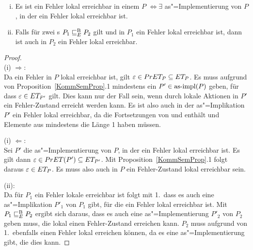 \begin{Kor}\mbox{}
  \label{lokalFehlerErrKor}
  \begin{enumerate}[(i)]
    \item Es ist ein Fehler lokal erreichbar in einem \MEIO{} $P$
      $\Leftrightarrow \exists$ as"=Implementierung von $P$, in der ein Fehler
      lokal erreichbar ist.
    \item Falls für zwei \MEIO{}s $P_1 \sqsubseteq  _E^\mathrm{B} P_2$ gilt und in $P_1$ ein Fehler
      lokal erreichbar ist, dann ist auch in $P_2$ ein Fehler lokal erreichbar.
  \end{enumerate}
\end{Kor}
\begin{proof}\mbox{}\\
  (i) $\Rightarrow$:\\
  Da ein Fehler in $P$ lokal erreichbar ist, gilt $\varepsilon \in PrET _P
  \subseteq ET _P$. Es muss aufgrund von Proposition~\ref{KommSemProp}.1
  mindestens ein $P'\in\mathrm{as}\text{-}\mathrm{impl} (P)$ geben, für dass $\varepsilon \in ET _{P'}$
  gilt. Dies kann nur der Fall sein, wenn durch lokale Aktionen in $P'$
  ein Fehler-Zustand erreicht werden kann. Es ist also auch in der
  as"=Implikation $P'$ ein Fehler lokal erreichbar, da \ET{} die Fortsetzungen
  von \PrET{} und \MIT{} enthält und Elemente aus \MIT{} mindestens die Länge 1
  haben müssen.

  (i) $\Leftarrow$:\\
  Sei $P'$ die as"=Implementierung von $P$, in der ein Fehler lokal erreichbar
  ist. Es gilt dann $\varepsilon\in PrET (P') \subseteq ET _{P'}$. Mit
  Proposition~\ref{KommSemProp}.1 folgt daraus $\varepsilon \in ET _P$. Es
  muss also auch in $P$ ein Fehler-Zustand lokal erreichbar sein.

  (ii):\\
  Da für $P_1$ ein Fehler lokale erreichbar ist folgt mit 1.\, dass es auch
  eine as"=Implikation $P'_1$ von $P_1$ gibt, für die ein Fehler lokal
  erreichbar ist. Mit $P_1 \sqsubseteq  _E^\mathrm{B} P_2$ ergibt sich daraus, dass es auch eine
  as"=Implementierung $P'_2$ von $P_2$ geben muss, die lokal einen
  Fehler-Zustand erreichen kann. $P_2$ muss aufgrund von 1.\ ebenfalls einen
  Fehler lokal erreichen können, da es eine as"=Implementierung gibt, die dies
  kann.
\end{proof}

